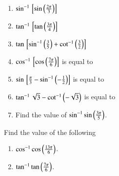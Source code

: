 \begin{enumerate}[label=\thesubsection.\arabic*,ref=\thesubsection.\theenumi,itemsep=1ex]
	\item 
		$\sin^{-1}{}\left[\sin\left(\frac{2\pi}{3}\right)\right]$ 
	\item 
		$\tan^{-1}{}\left[\tan\left(\frac{3\pi}{4}\right)\right]$ 
	\item 
		$\tan{}\left[\sin^{-1}\left(\frac{3}{5}\right)+\cot^{-1}\left(\frac{3}{2}\right)\right]$
	\item 
		$\cos^{-1}{}\left[\cos \left(\frac{7\pi}{6}\right)\right]$ 
		is equal to 
\begin{enumerate}
\end{enumerate}
	\item 
		$\sin{}\left[\frac{\pi}{3}-\sin^{-1}\left(-\frac{1}{2}\right)\right]$ 
		is equal to 
\begin{enumerate}
\end{enumerate}
	\item 
		$\tan^{-1}\sqrt{3}-\cot^{-1}\left(-\sqrt{3}\right)$ 
		is equal to 
\begin{enumerate}
\end{enumerate}
\item Find the value of $\sin ^{-1}\sin\left(\frac{3\pi}{5}\right)$.
\end{enumerate}
Find the value of the following
\begin{enumerate}[label=\thesubsection.\arabic*,ref=\thesubsection.\theenumi,resume*,itemsep=1ex]
\item $\cos^{-1}\cos\left(\frac{13\pi}{6}\right)$.
\item $\tan^{-1}\tan\left(\frac{7\pi}{6}\right)$.
\end{enumerate}
